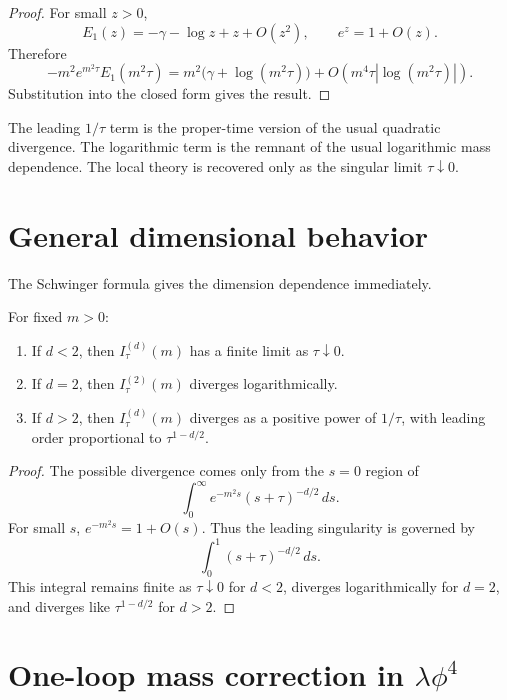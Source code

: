 \documentclass[11pt]{article}
\begin{document}
\begin{proof}
For small \(z>0\),
\[
E_1(z)=-\gamma-\log z+z+O(z^2),
\qquad
e^z=1+O(z).
\]
Therefore
\[
-m^2e^{m^2\tau}E_1(m^2\tau)
=
m^2\bigl(\gamma+\log(m^2\tau)\bigr)
+
O(m^4\tau|\log(m^2\tau)|).
\]
Substitution into the closed form gives the result.
\end{proof}

\begin{remark}
The leading \(1/\tau\) term is the proper-time version of the usual quadratic divergence. The logarithmic term is the remnant of the usual logarithmic mass dependence. The local theory is recovered only as the singular limit \(\tau\downarrow0\).
\end{remark}

\section{General dimensional behavior}

The Schwinger formula gives the dimension dependence immediately.

\begin{proposition}
For fixed \(m>0\):
\begin{enumerate}
\item If \(d<2\), then \(I_\tau^{(d)}(m)\) has a finite limit as \(\tau\downarrow0\).
\item If \(d=2\), then \(I_\tau^{(2)}(m)\) diverges logarithmically.
\item If \(d>2\), then \(I_\tau^{(d)}(m)\) diverges as a positive power of \(1/\tau\), with leading order proportional to \(\tau^{1-d/2}\).
\end{enumerate}
\end{proposition}

\begin{proof}
The possible divergence comes only from the \(s=0\) region of
\[
\int_0^\infty e^{-m^2s}(s+\tau)^{-d/2}\,ds.
\]
For small \(s\), \(e^{-m^2s}=1+O(s)\). Thus the leading singularity is governed by
\[
\int_0^1 (s+\tau)^{-d/2}\,ds.
\]
This integral remains finite as \(\tau\downarrow0\) for \(d<2\), diverges logarithmically for \(d=2\), and diverges like \(\tau^{1-d/2}\) for \(d>2\).
\end{proof}

\section{One-loop mass correction in \(\lambda\phi^4\)}
\end{document}
